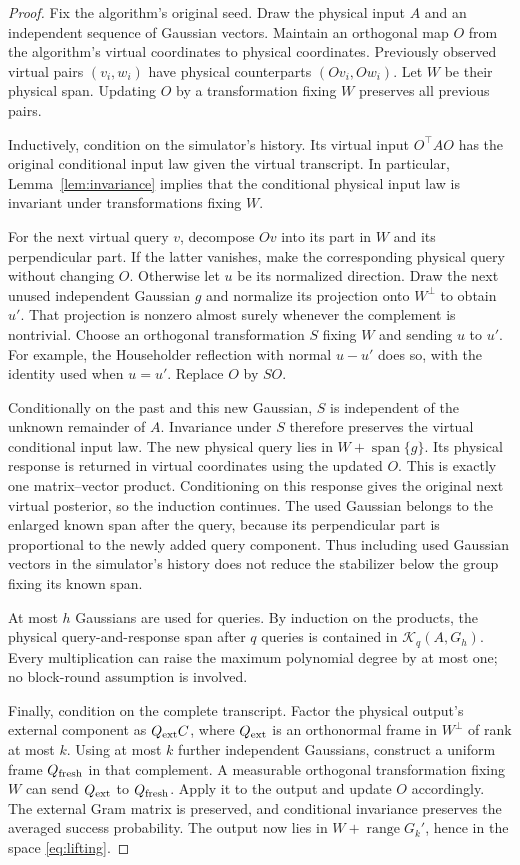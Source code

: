 \documentclass[11pt]{article}
\theoremstyle{definition}
\newcommand{\ran}{\operatorname{range}}
\newcommand{\spn}{\operatorname{span}}
\newcommand{\K}{\mathcal K}
\begin{document}
\begin{proof}
Fix the algorithm's original seed. Draw the physical input $A$ and an independent sequence of Gaussian vectors. Maintain an orthogonal map $O$ from the algorithm's virtual coordinates to physical coordinates. Previously observed virtual pairs $(v_i,w_i)$ have physical counterparts $(Ov_i,Ow_i)$. Let $W$ be their physical span. Updating $O$ by a transformation fixing $W$ preserves all previous pairs.

Inductively, condition on the simulator's history. Its virtual input $O^\top AO$ has the original conditional input law given the virtual transcript. In particular, Lemma~\ref{lem:invariance} implies that the conditional physical input law is invariant under transformations fixing $W$.

For the next virtual query $v$, decompose $Ov$ into its part in $W$ and its perpendicular part. If the latter vanishes, make the corresponding physical query without changing $O$. Otherwise let $u$ be its normalized direction. Draw the next unused independent Gaussian $g$ and normalize its projection onto $W^\perp$ to obtain $u'$. That projection is nonzero almost surely whenever the complement is nontrivial. Choose an orthogonal transformation $S$ fixing $W$ and sending $u$ to $u'$. For example, the Householder reflection with normal $u-u'$ does so, with the identity used when $u=u'$. Replace $O$ by $SO$.

Conditionally on the past and this new Gaussian, $S$ is independent of the unknown remainder of $A$. Invariance under $S$ therefore preserves the virtual conditional input law. The new physical query lies in $W+\spn\{g\}$. Its physical response is returned in virtual coordinates using the updated $O$. This is exactly one matrix--vector product. Conditioning on this response gives the original next virtual posterior, so the induction continues. The used Gaussian belongs to the enlarged known span after the query, because its perpendicular part is proportional to the newly added query component. Thus including used Gaussian vectors in the simulator's history does not reduce the stabilizer below the group fixing its known span.

At most $h$ Gaussians are used for queries. By induction on the products, the physical query-and-response span after $q$ queries is contained in $\K_q(A,G_h)$. Every multiplication can raise the maximum polynomial degree by at most one; no block-round assumption is involved.

Finally, condition on the complete transcript. Factor the physical output's external component as $Q_{\rm ext}C$, where $Q_{\rm ext}$ is an orthonormal frame in $W^\perp$ of rank at most $k$. Using at most $k$ further independent Gaussians, construct a uniform frame $Q_{\rm fresh}$ in that complement. A measurable orthogonal transformation fixing $W$ can send $Q_{\rm ext}$ to $Q_{\rm fresh}$. Apply it to the output and update $O$ accordingly. The external Gram matrix is preserved, and conditional invariance preserves the averaged success probability. The output now lies in $W+\ran G_k'$, hence in the space \eqref{eq:lifting}.


\end{proof}
\end{document}
